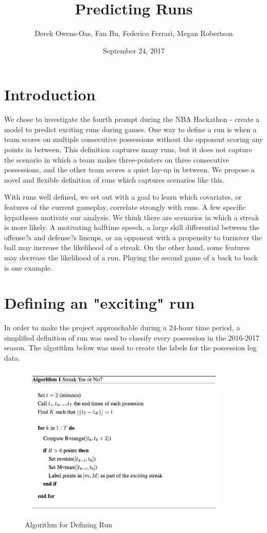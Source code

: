 \documentclass{article}
\title{Predicting Runs}
\author{Derek Owens-Oas, Fan Bu, Federico Ferrari, Megan Robertson}
\date{September 24, 2017}
\begin{document}
\maketitle

\section{Introduction}

We chose to investigate the fourth prompt during the NBA Hackathon - create a model to predict exciting runs during games. One way to define a run is when a team scores on multiple consecutive possessions without the opponent scoring any points in between. This definition captures many runs, but it does not capture the scenario in which a team makes three-pointers on three consecutive possessions, and the other team scores a quiet lay-up in between. We propose a novel and flexible definition of runs which captures scenarios like this. \newline

With runs well defined, we set out with a goal to learn which covariates, or features of the current gameplay, correlate strongly with runs. A few specific hypotheses motivate our analysis. We think there are scenarios in which a streak is more likely. A motivating halftime speech, a large skill differential between the offense?s and defense?s lineups, or an opponent with a propensity to turnover the ball may increase the likelihood of a streak. On the other hand, some features may decrease the likelihood of a run. Playing the second game of a back to back is one example.

\section{Defining an "exciting" run}

In order to make the project approachable during a 24-hour time period, a simplified definition of run was used to classify every possession in the 2016-2017 season. The algorithm below was used to create the labels for the possession log data. 

\begin{figure}[h]
\begin{center}
\includegraphics[width=100mm]{run_alg.png}
\caption{Algorithm for Defining Run}
\end{center}
\end{figure}
\end{document}
